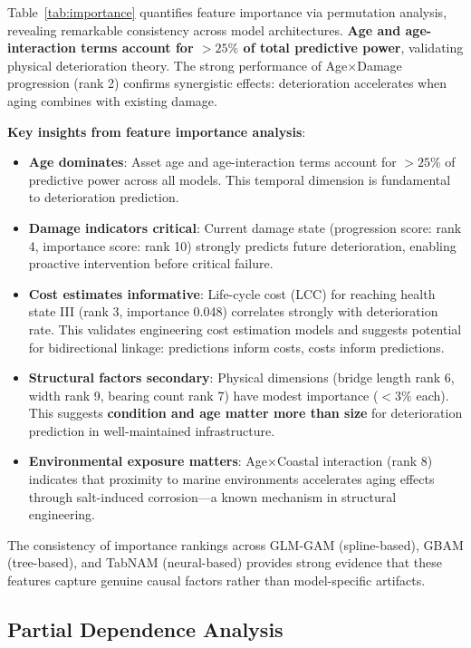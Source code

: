 \documentclass[twocolumn]{article}
\begin{document}
Table~\ref{tab:importance} quantifies feature importance via permutation analysis, revealing remarkable consistency across model architectures. \textbf{Age and age-interaction terms account for $>25\%$ of total predictive power}, validating physical deterioration theory. The strong performance of Age×Damage progression (rank 2) confirms synergistic effects: deterioration accelerates when aging combines with existing damage.

\textbf{Key insights from feature importance analysis}:
\begin{itemize}
\item \textbf{Age dominates}: Asset age and age-interaction terms account for $>25\%$ of predictive power across all models. This temporal dimension is fundamental to deterioration prediction.
\item \textbf{Damage indicators critical}: Current damage state (progression score: rank 4, importance score: rank 10) strongly predicts future deterioration, enabling proactive intervention before critical failure.
\item \textbf{Cost estimates informative}: Life-cycle cost (LCC) for reaching health state III (rank 3, importance 0.048) correlates strongly with deterioration rate. This validates engineering cost estimation models and suggests potential for bidirectional linkage: predictions inform costs, costs inform predictions.
\item \textbf{Structural factors secondary}: Physical dimensions (bridge length rank 6, width rank 9, bearing count rank 7) have modest importance ($<3\%$ each). This suggests \textbf{condition and age matter more than size} for deterioration prediction in well-maintained infrastructure.
\item \textbf{Environmental exposure matters}: Age×Coastal interaction (rank 8) indicates that proximity to marine environments accelerates aging effects through salt-induced corrosion—a known mechanism in structural engineering.
\end{itemize}

The consistency of importance rankings across GLM-GAM (spline-based), GBAM (tree-based), and TabNAM (neural-based) provides strong evidence that these features capture genuine causal factors rather than model-specific artifacts.

\subsection{Partial Dependence Analysis}
\end{document}
